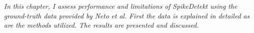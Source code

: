 
\label{cap:chapter2}

\textit{In this chapter, I assess performance and limitations of SpikeDetekt using the ground-truth data provided by Neto et al. First the data is explained in detailed as are the methods utilized. The results are presented and discussed.}

%



%
\cleardoublepage
